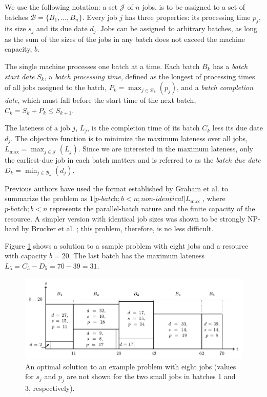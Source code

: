 \documentclass[oribibl]{llncs}
\def\Lmax{{L_{\mathrm{max}}}}
\begin{document}
We use the following notation: a set $\mathcal{J}$ of $n$ jobs,
is to be assigned to a set of batches $\mathcal{B} = \{B_1,\dots,B_n\}$. Every
job $j$ has three properties: its processing time $p_j$, its size $s_j$
and its due date $d_j$. Jobs can be assigned to arbitrary batches, as
long as the sum of the sizes of the jobs in any batch does not exceed
the machine capacity, $b$.

The single machine processes one batch at a time. Each batch $B_k$ has a
\textit{batch start date} $S_k$, a \textit{batch processing time},
defined as the longest of processing times of all jobs assigned to the
batch, $P_k = \max_{j\in \mathcal{B}_k}(p_j)$, and a \textit{batch completion
  date}, which must fall before the start time of the next batch, $C_k
= S_k + P_k \leq S_{k+1}$.

The lateness of a job $j$, $L_j$, is the completion time of its batch
$C_k$ less its due date $d_j$. The objective function is to minimize the
maximum lateness over all jobs, $\Lmax = \max_{j \in \mathcal{J}}(L_j)$. Since we
are interested in the maximum lateness, only the earliest-due job in
each batch matters and is referred to as the \textit{batch due date}
$D_k = \min_{j\in \mathcal{B}_k}(d_j)$.

Previous authors have used the format established by Graham et al.
\cite{graham} to summarize the problem as $1|\textit{p-batch}; b
< n; \textit{non-identical}|\Lmax$ \cite{Daste, Malapert}, where
$\textit{p-batch};b<n$ represents the parallel-batch nature and the
finite capacity of the resource. A simpler version with identical job
sizes was shown to be strongly NP-hard by Brucker et al. \cite{Brucker};
this problem, therefore, is no less difficult.

Figure \ref{fig:intro_tetris} shows a solution to a sample
problem with eight jobs and a resource with capacity $b = 20$. The last batch
has the maximum lateness $L_5 = C_5 - D_5 = 70 - 39 = 31$.

\begin{figure}[th]
\centering
\includegraphics[width=\textwidth]{tetris.pdf}
\caption{An optimal solution to an example problem with eight jobs (values for
  $s_j$ and $p_j$ are not shown for the two small jobs in batches 1 and 3,
respectively).}
  \label{fig:intro_tetris}
\end{figure}
\end{document}
